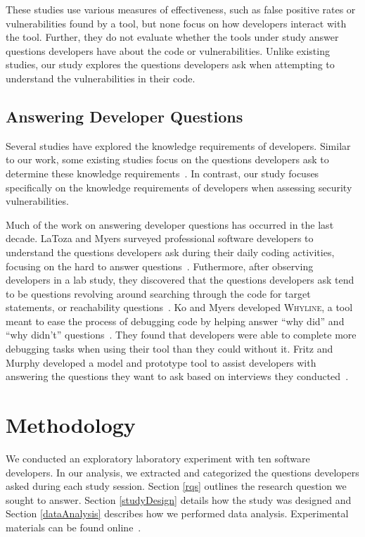\documentclass{acm_proc_article-sp}
\begin{document}
These studies use various measures of effectiveness, such as false positive rates or vulnerabilities found by a tool, but none focus on how developers interact with the tool. 
Further, they do not evaluate whether the tools under study answer questions developers have about the code or vulnerabilities. 
Unlike existing studies, our study explores the questions developers ask when attempting to understand the vulnerabilities in their code.

\subsection{Answering Developer Questions}
\label{questions}
Several studies have explored the knowledge requirements of developers.
Similar to our work, some existing studies focus on the questions developers ask to determine these knowledge requirements~\cite{latoza2010hard, latoza2010developers}.
In contrast, our study focuses specifically on the knowledge requirements of developers when assessing security vulnerabilities.


Much of the work on answering developer questions has occurred in the last decade. 
LaToza and Myers surveyed professional software developers to understand the questions developers ask during their daily coding activities, focusing on the hard to answer questions~\cite{latoza2010hard}. 
Futhermore, after observing developers in a lab study, they discovered that the questions developers ask tend to be questions revolving around searching through the code for target statements, or reachability questions~\cite{latoza2010developers}. 
Ko and Myers developed \textsc{Whyline}, a tool meant to ease the process of debugging code by helping answer ``why did'' and ``why didn't'' questions~\cite{ko2004designing}. 
They found that developers were able to complete more debugging tasks when using their tool than they could without it.
Fritz and Murphy developed a model and prototype tool to assist developers with answering the questions they want to ask based on interviews they conducted~\cite{fritz2010using}.


\section{Methodology}
\label{sec:meth}
We conducted an exploratory laboratory experiment with ten software developers. In our analysis, we extracted and categorized the questions developers asked during each study session. 
Section \ref{rqs} outlines the research question we sought to answer. 
Section \ref{studyDesign} details how the study was designed and Section \ref{dataAnalysis} describes how we performed data analysis.
Experimental materials can be found online~\cite{ExperimentalMaterials}.
\end{document}
